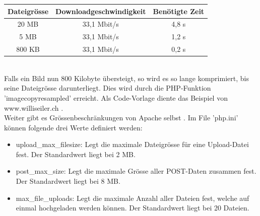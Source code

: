 \begin{tabular}{|c|c|c|}
	\hline 
	Dateigrösse & Downloadgeschwindigkeit & Benötigte Zeit \\ 
	\hline 
	20 MB & 33,1 Mbit/s & 4,8 s \\ 
	\hline 
	5 MB & 33,1 Mbit/s & 1,2 s \\ 
	\hline 
	800 KB & 33,1 Mbit/s & 0,2 s \\ 
	\hline 
\end{tabular}\\

Falls ein Bild nun 800 Kilobyte übersteigt, so wird es so lange komprimiert, bis seine Dateigrösse darunterliegt. Dies wird durch die PHP-Funktion 'imagecopyresampled' erreicht. Als Code-Vorlage diente das Beispiel von www.williseiler.ch \cite{willis_php}. \\

Weiter gibt es Grössenbeschränkungen von Apache selbst \cite{stackoverflow_largeFilePHP}. Im File 'php.ini' können folgende drei Werte definiert werden:
\begin{itemize}
	\item upload\_max\_filesize: Legt die maximale Dateigrösse für eine Upload-Datei fest. Der Standardwert liegt bei 2 MB.
	\item post\_max\_size: Legt die maximale Grösse aller POST-Daten zusammen fest. Der Standardwert liegt bei 8 MB.
	\item max\_file\_uploads: Legt die maximale Anzahl aller Dateien fest, welche auf einmal hochgeladen werden können. Der Standardwert liegt bei 20 Dateien.
\end{itemize}

